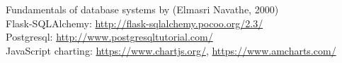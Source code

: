 \cleardoublepage
{}
{}



\begin{thebibliography}{99}

\bibitem{}Fundamentals of database systems by (Elmasri Navathe, 2000)\\

\bibitem{} Flask-SQLAlchemy: \url{http://flask-sqlalchemy.pocoo.org/2.3/}\\

\bibitem{} Postgresql: \url{http://www.postgresqltutorial.com/}\\

\bibitem{} JavaScript charting: \url{https://www.chartjs.org/}, \url{https://www.amcharts.com/}\\

\end{thebibliography}
